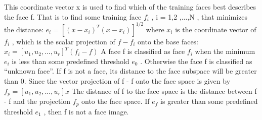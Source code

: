 This coordinate  vector x is used to find which 
of the training faces best describes the 
face  f. That is to  find  some  training  face $f_i$ ,
i = 1,2 ,...,N , that minimizes the distance:
$ e_i= [(x - x_i)^T(x - x_i)]^{1/2}$
where $x_i$ is the coordinate vector of
$f_i$ , which is
the  scalar  projection of $f - f_i$ onto  the  base­ 
faces:$x_i = [u_1, u_2,..., u_r]^T(f_i - f)$
A face f is classified  as face $f_i$ when the 
minimum $e_i$ is less than some  predefined
threshold  $e_0$ . Otherwise  the  face  f is classified 
as “unknown face”.
If f is not  a  face, its distance  to the  face 
subspace will be greater than 0. Since the vector
projection of f - f onto the face space is given 
by$f_p = [ u_1, u_2,..., u_r ]x$
The  distance  of f to the  face  space  is the 
distance  between f - f and  the  projection $f_p$
onto the face space.
If $e_f$ is greater than some predefined threshold 
$e_1$ , then f is not a face image.

